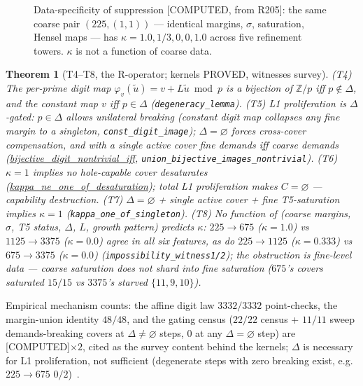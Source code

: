 \documentclass[11pt,a4paper]{article}
\newtheorem{theorem}{Theorem}
\theoremstyle{definition}
\begin{document}
\begin{figure}[t]
  \centering
  \caption{Data-specificity of suppression [COMPUTED, from R205]: the
    same coarse pair $(225,(1,1))$ --- identical margins, $\sigma$,
    saturation, Hensel maps --- has $\kappa=1.0,1/3,0,0,1.0$ across five
    refinement towers. $\kappa$ is not a function of coarse data.}
  \label{fig:kappa}
\end{figure}

\begin{theorem}[T4--T8, the R-operator; kernels PROVED, witnesses survey]
  \label{thm:t8}
  (T4) The per-prime digit map $\varphi_v(\tilde u)=v+L\tilde u\bmod p$
  is a bijection of $\mathbb{Z}/p$ iff $p\notin\Delta$, and the constant
  map $v$ iff $p\in\Delta$ (\texttt{degeneracy\_lemma}). (T5) L1
  proliferation is $\Delta$-gated: $p\in\Delta$ allows \emph{unilateral}
  breaking (constant digit map collapses any fine margin to a singleton,
  \texttt{const\_digit\_image}); $\Delta=\varnothing$ forces
  cross-cover compensation, and with a single active cover fine demands
  iff coarse demands
  (\url{bijective_digit_nontrivial_iff},
  \texttt{union\_bijective\_images\_nontrivial}). (T6) $\kappa=1$ implies
  no hole-capable cover desaturates
  (\url{kappa_ne_one_of_desaturation}); total L1 proliferation
  makes $C=\varnothing$ --- capability destruction. (T7) $\Delta=
  \varnothing$ + single active cover + fine T5-saturation implies
  $\kappa=1$ (\texttt{kappa\_one\_of\_singleton}). (T8) No function of
  (coarse margins, $\sigma$, T5 status, $\Delta$, $L$, growth pattern)
  predicts $\kappa$: $225\to675$ ($\kappa=1.0$) vs $1125\to3375$
  ($\kappa=0.0$) agree in all six features, as do $225\to1125$
  ($\kappa=0.333$) vs $675\to3375$ ($\kappa=0.0$)
  (\texttt{impossibility\_witness1/2}); the obstruction is fine-level
  data --- coarse saturation does not shard into fine saturation ($675$'s
  covers saturated $15/15$ vs $3375$'s starved $\{11,9,10\}$).
\end{theorem}
Empirical mechanism counts: the affine digit law $3332/3332$
point-checks, the margin-union identity $48/48$, and the gating census
($22/22$ census + $11/11$ sweep demands-breaking covers at $\Delta\ne
\varnothing$ steps, $0$ at any $\Delta=\varnothing$ step) are
[COMPUTED]$\times2$, cited as the survey content behind the kernels;
$\Delta$ is necessary for L1 proliferation, not sufficient (degenerate
steps with zero breaking exist, e.g.\ $225\to675$ $0/2$)~\cite{D207,D214}.
\end{document}
